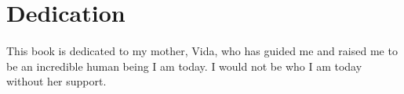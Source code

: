 \newpage

\section{Dedication}

\paragraph{  } This book is dedicated to my mother, Vida, who has guided me and raised me to be an incredible human being I am today. I would not be who I am today without her support.